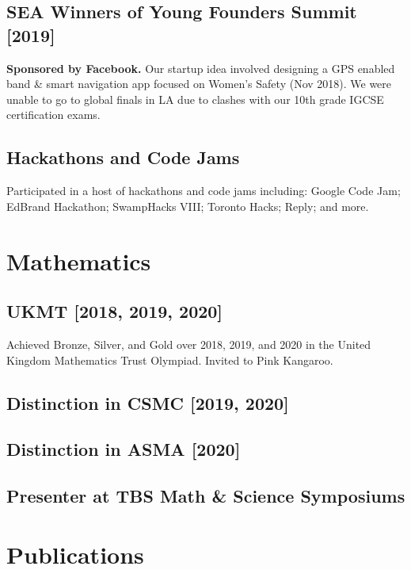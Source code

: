 \documentclass[%
               doublesided,
               paper=a4,
               fontsize=10pt
              ]{resumestyle}
\begin{document}
{        \subsection{SEA Winners of Young Founders Summit [2019]}
            \textbf{Sponsored by Facebook.}  Our startup idea involved designing a GPS enabled band & smart navigation app focused on Women’s Safety (Nov 2018). We were unable to go to global finals in LA due to clashes with our 10th grade IGCSE certification exams.
            
        \subsection{Hackathons and Code Jams}
            Participated in a host of hackathons and code jams including: Google Code Jam; EdBrand Hackathon; SwampHacks VIII; Toronto Hacks; Reply; and more.
            
    \section{Mathematics}
        \subsection{UKMT [2018, 2019, 2020]}
            Achieved Bronze, Silver, and Gold over 2018, 2019, and 2020 in the United Kingdom Mathematics Trust Olympiad. Invited to Pink Kangaroo.
            
        \subsection{Distinction in CSMC [2019, 2020]}
        
        \subsection{Distinction in ASMA [2020]}
            
        \subsection{Presenter at TBS Math \& Science Symposiums}

}
\makebody


\clearpage
\pagestyle{empty}

\section{Publications}
\pubforcefullwidth
\end{document}
